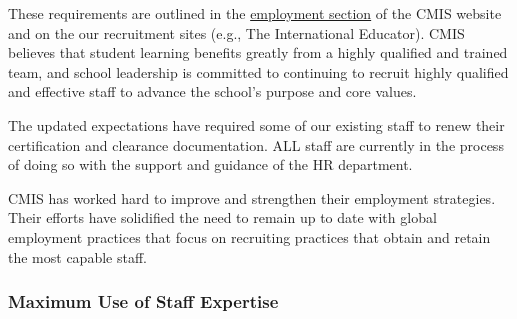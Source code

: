 \begin{findings}
These requirements are outlined in the \href{http://cmis.ac.th/about/employment}{employment section} of the CMIS website and on the our recruitment sites (e.g., The International Educator). CMIS believes that student learning benefits greatly from a highly qualified and trained team, and school leadership is committed to continuing to recruit highly qualified and effective staff to advance the school’s purpose and core values.

The updated expectations have required some of our existing staff to renew their certification and clearance documentation. ALL staff are currently in the process of doing so with the support and guidance of the HR department.


CMIS has worked hard to improve and strengthen their employment strategies. Their efforts have solidified the need to remain up to date with global employment practices that focus on recruiting practices that obtain and retain the most capable staff.
\end{findings}

\subsubsection{Maximum Use of Staff Expertise}



